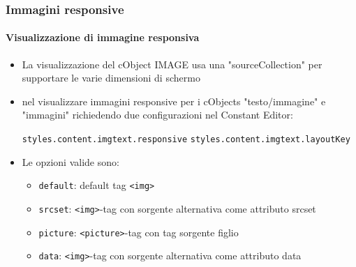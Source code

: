 \begin{frame}[fragile]
	\frametitle{Immagini responsive}
	\framesubtitle{Visualizzazione di immagine responsiva}

	\begin{itemize}
		\item La visualizzazione del cObject IMAGE usa una "sourceCollection" per supportare le varie dimensioni di schermo
		\item nel visualizzare immagini responsive per i cObjects "testo/immagine" e "immagini" richiedendo due configurazioni nel Constant Editor:

			\texttt{styles.content.imgtext.responsive}\newline
			\texttt{styles.content.imgtext.layoutKey}

		\item Le opzioni valide sono:

			\begin{itemize}
				\item \texttt{default}:	\tabto{2cm} default tag \texttt{<img>}
				\item \texttt{srcset}:	\tabto{2cm} \texttt{<img>}-tag con sorgente alternativa come attributo srcset
				\item \texttt{picture}:	\tabto{2cm} \texttt{<picture>}-tag con tag sorgente figlio
				\item \texttt{data}:	\tabto{2cm} \texttt{<img>}-tag con sorgente alternativa come attributo data
			\end{itemize}

	\end{itemize}

\end{frame}


